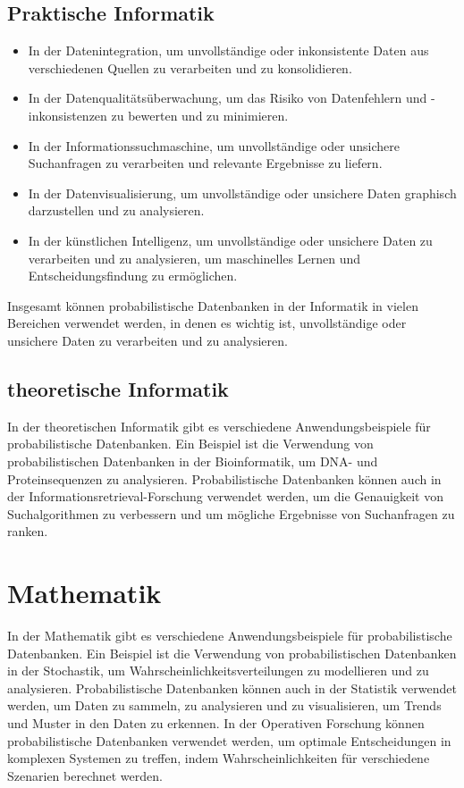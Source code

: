 \subsection{Praktische Informatik}
\begin{itemize}
	\item In der Datenintegration, um unvollständige oder inkonsistente Daten aus verschiedenen Quellen zu verarbeiten und zu konsolidieren.
	
	\item In der Datenqualitätsüberwachung, um das Risiko von Datenfehlern und -inkonsistenzen zu bewerten und zu minimieren.
	
	\item In der Informationssuchmaschine, um unvollständige oder unsichere Suchanfragen zu verarbeiten und relevante Ergebnisse zu liefern.
	
	\item In der Datenvisualisierung, um unvollständige oder unsichere Daten graphisch darzustellen und zu analysieren.
	
	\item In der künstlichen Intelligenz, um unvollständige oder unsichere Daten zu verarbeiten und zu analysieren, um maschinelles Lernen und Entscheidungsfindung zu ermöglichen.
	
\end{itemize}
Insgesamt können probabilistische Datenbanken in der Informatik in vielen Bereichen verwendet werden, in denen es wichtig ist, unvollständige oder unsichere Daten zu verarbeiten und zu analysieren.

\subsection{theoretische Informatik}
In der theoretischen Informatik gibt es verschiedene Anwendungsbeispiele für probabilistische Datenbanken. Ein Beispiel ist die Verwendung von probabilistischen Datenbanken in der Bioinformatik, um DNA- und Proteinsequenzen zu analysieren. Probabilistische Datenbanken können auch in der Informationsretrieval-Forschung verwendet werden, um die Genauigkeit von Suchalgorithmen zu verbessern und um mögliche Ergebnisse von Suchanfragen zu ranken.

\section{Mathematik}
In der Mathematik gibt es verschiedene Anwendungsbeispiele für probabilistische Datenbanken. Ein Beispiel ist die Verwendung von probabilistischen Datenbanken in der Stochastik, um Wahrscheinlichkeitsverteilungen zu modellieren und zu analysieren. Probabilistische Datenbanken können auch in der Statistik verwendet werden, um Daten zu sammeln, zu analysieren und zu visualisieren, um Trends und Muster in den Daten zu erkennen. In der Operativen Forschung können probabilistische Datenbanken verwendet werden, um optimale Entscheidungen in komplexen Systemen zu treffen, indem Wahrscheinlichkeiten für verschiedene Szenarien berechnet werden.


